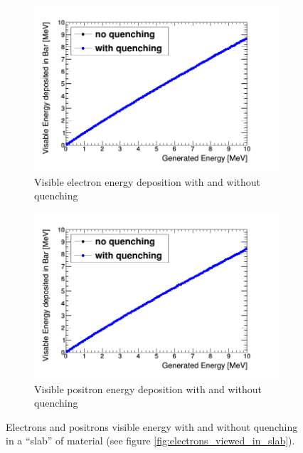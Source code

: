 \begin{figure}[!h]
\centering
\begin{subfigure}{.5\textwidth}
  \centering
  \includegraphics[width=\linewidth]{quench_eng_LinElectrons.png}
  \captionsetup{width=.9\linewidth}
  \caption{Visible electron energy deposition with and without quenching}
  \label{subFig:electron_quenched_and_not}
\end{subfigure}%
\begin{subfigure}{.5\textwidth}
  \centering
  \includegraphics[width=\linewidth]{quench_eng_LinPositrons.png}
  \captionsetup{width=.9\linewidth}
  \caption{Visible positron energy deposition with and without quenching}
  \label{subFig:positron_quenched_and_not}
\end{subfigure}
\caption{Electrons and positrons visible energy with and without quenching in a ``slab'' of material (see figure \ref{fig:electrons_viewed_in_slab}).}
\label{fig:electron_positron_quenched_and_not}
\end{figure}

